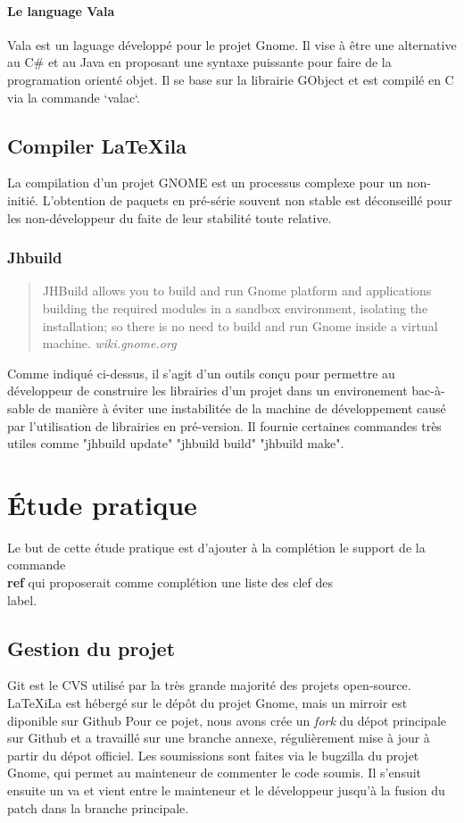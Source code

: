 \documentclass[a4paper,11pt]{report}
\begin{document}
\subsubsection{Le language Vala}
\label{sss:vala}
Vala est un laguage développé pour le projet Gnome. Il vise à être une alternative au C\# et au Java en proposant une syntaxe puissante pour faire de la programation orienté objet. Il se base sur la librairie GObject et est compilé en C via la commande `valac`.

\section{Compiler LaTeXila}
\label{cha:compiler}
La compilation d'un projet GNOME est un processus complexe pour un non-initié. L'obtention de paquets en pré-série souvent non stable est déconseillé pour les non-développeur du faite de leur stabilité toute relative.

\subsection{Jhbuild}
\label{sub:jhbuild}
\begin{quote}
  JHBuild allows you to build and run Gnome platform and applications building the required modules in a sandbox environment, isolating the installation; so there is no need to build and run Gnome inside a virtual machine. \textit{wiki.gnome.org}
\end{quote}
Comme indiqué ci-dessus, il s'agit d'un outils conçu pour permettre au développeur de construire les librairies d'un projet dans un environement bac-à-sable de manière à éviter une instabilitée de la machine de développement causé par l'utilisation de librairies en pré-version. Il fournie certaines commandes très utiles comme "jhbuild update" "jhbuild build" "jhbuild make".

\chapter{Étude pratique} %
\label{cha:etude_pratique}
Le but de cette étude pratique est d'ajouter à la complétion le support de la commande \textbf{\\ref} qui proposerait comme complétion une liste des clef des \\label. 

\section{Gestion du projet} %
\label{sec:git}
Git est le CVS utilisé par la très grande majorité des projets open-source. LaTeXiLa est hébergé sur le dépôt du projet Gnome, mais un mirroir est diponible sur Github %
Pour ce pojet, nous avons crée un \textit{fork} du dépot principale sur Github et a travaillé sur une branche annexe, régulièrement mise à jour à partir du dépot officiel.
Les soumissions sont faites via le bugzilla du projet Gnome, qui permet au mainteneur de commenter le code soumis. Il s'ensuit ensuite un va et vient entre le mainteneur et le développeur jusqu'à la fusion du patch dans la branche principale.
\end{document}
